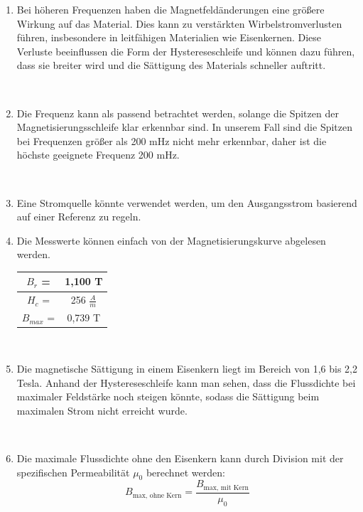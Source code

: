 \documentclass[a4paper,twoside,12pt,DIV=13,BCOR=5mm,numbers=noenddot,cleardoublepage=empty]{scrbook}
\begin{document}
\begin{enumerate}
            \\

            \item Bei höheren Frequenzen haben die Magnetfeldänderungen eine größere Wirkung auf das Material. Dies kann zu verstärkten Wirbelstromverlusten führen, insbesondere in leitfähigen Materialien wie Eisenkernen. Diese Verluste beeinflussen die Form der Hystereseschleife und können dazu führen, dass sie breiter wird und die Sättigung des Materials schneller auftritt.

            \\

            \item Die Frequenz kann als passend betrachtet werden, solange die Spitzen der Magnetisierungsschleife klar erkennbar sind. In unserem Fall sind die Spitzen bei Frequenzen größer als 200 mHz nicht mehr erkennbar, daher ist die höchste geeignete Frequenz 200 mHz.

            \\

            \item Eine Stromquelle könnte verwendet werden, um den Ausgangsstrom basierend auf einer Referenz zu regeln.             
            \\

            \item Die Messwerte können einfach von der Magnetisierungskurve abgelesen werden. \\
            \begin{tabular}{|c|c|}
                $B_r$ =& 1,100 T  \\ \hline
                $H_c$ =& 256 $\frac{A}{m}$ \\ \hline
                $B_{max}$ =& 0,739 T \hline
            \end{tabular}
            
            \\
            
            \item Die magnetische Sättigung in einem Eisenkern liegt im Bereich von 1,6 bis 2,2 Tesla. Anhand der Hystereseschleife kann man sehen, dass die Flussdichte bei maximaler Feldstärke noch steigen könnte, sodass die Sättigung beim maximalen Strom nicht erreicht wurde.

            \\
            
            \item Die maximale Flussdichte ohne den Eisenkern kann durch Division mit der spezifischen Permeabilität $\mu_0$ berechnet werden:
                \begin{equation}
                B_{\text{max, ohne Kern}} = \frac{B_{\text{max, mit Kern}}}{\mu_0}
                \end{equation}
    

\end{enumerate}
\end{document}
